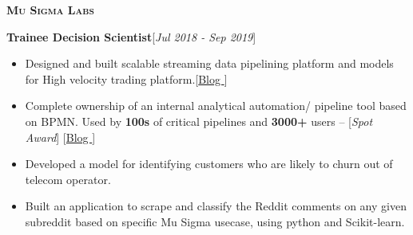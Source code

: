 \documentclass[10pt]{article}
\renewcommand{\textbf}[1]{{\bfseries\color{accent_darkest}#1}}
\newenvironment{leftindented}%
  {\list{}{\leftmargin=0.5in}\item[]}%
  {\endlist}
\begin{document}
\large\textsc{\textbf{Mu Sigma Labs}}\normalsize%
\begin{leftindented}
\textbf{Trainee Decision Scientist}\hfill \textcolor{grey_darker}{[\textit{Jul 2018 - Sep 2019}]}
\begin{itemize}
    \itemsep0em
    \item Designed and built scalable streaming data pipelining platform and models for High velocity trading platform.\textcolor{grey_darker}{[\href{https://ai.ragv.in/posts/high-velocity-trading-ml-systems/}{Blog \textcolor{grey_dark}{\faExternalLinkSquare}}]}
    \item Complete ownership of an internal analytical automation/ pipeline tool based on BPMN. Used by \textbf{100s} of critical pipelines and \textbf{3000+} users  -- [\textit{Spot Award}] \textcolor{grey_darker}{[\href{https://ai.ragv.in/posts/bpmn-pipeline-platform/}{Blog \textcolor{grey_dark}{\faExternalLinkSquare}}]}
    \item Developed a model for identifying customers who are likely to churn out of telecom operator.
    \item Built an application to scrape and classify the Reddit comments on any given subreddit based on specific Mu Sigma usecase, using python and Scikit-learn.
\end{itemize}
\end{leftindented}


\end{document}
